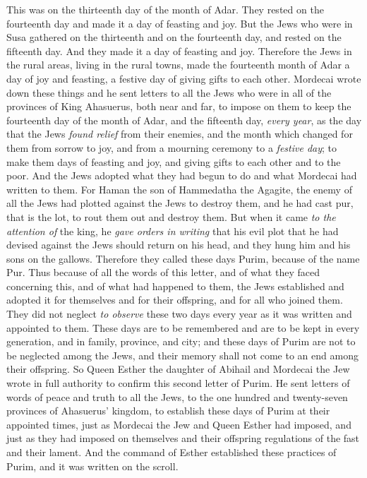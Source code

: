 \begin{biblechapter}
\verse This was on the thirteenth day of the month of Adar. They rested on the fourteenth day and made it a day of feasting and joy.
\verse But the Jews who were in Susa gathered on the thirteenth and on the fourteenth day, and rested on the fifteenth day. And they made it a day of feasting and joy.
\verse Therefore the Jews in the rural areas, living in the rural towns, made the fourteenth month of Adar a day of joy and feasting, a festive day of giving gifts to each other.
 Mordecai wrote down these things and he sent letters to all the Jews who were in all of the provinces of King Ahasuerus, both near and far,
\verse to impose on them to keep the fourteenth day of the month of Adar, and the fifteenth day, \textit{every year},
\verse as the day that the Jews \textit{found relief} from their enemies, and the month which changed for them from sorrow to joy, and from a mourning ceremony to a \textit{festive day}; to make them days of feasting and joy, and giving gifts to each other and to the poor.
\verse And the Jews adopted what they had begun to do and what Mordecai had written to them.
\verse For Haman the son of Hammedatha the Agagite, the enemy of all the Jews had plotted against the Jews to destroy them, and he had cast pur, that is the lot, to rout them out and destroy them.
\verse But when it came \textit{to the attention of} the king, he \textit{gave orders in writing} that his evil plot that he had devised against the Jews should return on his head, and they hung him and his sons on the gallows.
\verse Therefore they called these days Purim, because of the name Pur. Thus because of all the words of this letter, and of what they faced concerning this, and of what had happened to them,
\verse the Jews established and adopted it for themselves and for their offspring, and for all who joined them. They did not neglect \textit{to observe} these two days every year as it was written and appointed to them.
\verse These days are to be remembered and are to be kept in every generation, and in family, province, and city; and these days of Purim are not to be neglected among the Jews, and their memory shall not come to an end among their offspring.
\verse So Queen Esther the daughter of Abihail and Mordecai the Jew wrote in full authority to confirm this second letter of Purim.
\verse He sent letters of words of peace and truth to all the Jews, to the one hundred and twenty-seven provinces of Ahasuerus’ kingdom,
\verse to establish these days of Purim at their appointed times, just as Mordecai the Jew and Queen Esther had imposed, and just as they had imposed on themselves and their offspring regulations of the fast and their lament.
\verse And the command of Esther established these practices of Purim, and it was written on the scroll.
\end{biblechapter}

